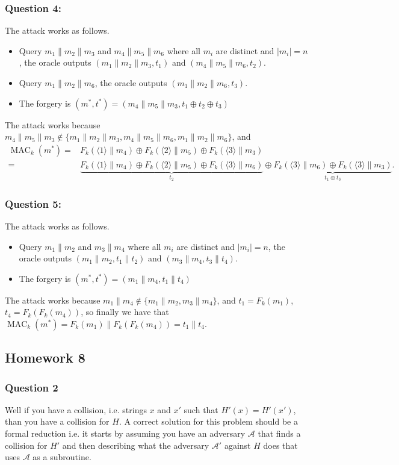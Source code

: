 \documentclass{article}
\numberwithin{defn}{section}
\numberwithin{equation}{section}
\newcommand{\MAC}{\operatorname{MAC}}
\begin{document}
\subsubsection*{Question 4:}
The attack works as follows. 
\begin{itemize}
	\item Query $m_1\|m_2\|m_3$ and $m_4\|m_5\|m_6$ where all $m_i$ are distinct and $|m_i|=n$, the oracle outputs $( m_1\|m_2\|m_3,t_1)$ and $( m_4\|m_5\|m_6,t_2)$.
	\item Query $m_1\|m_2\|m_6$, the oracle outputs $(m_1\|m_2\|m_6,t_3)$.
	\item The forgery is $(m^*,t^*)=( m_4\|m_5\|m_3,t_1\oplus t_2\oplus t_3 )$
\end{itemize}	
The attack works because $m_4\|m_5\|m_3\not\in \{m_1\|m_2\|m_3, m_4\|m_5\|m_6,m_1\|m_2\|m_6 \}$, and
\begin{align*}
\MAC_k(m^*)=&F_k(\langle 1\rangle \|m_4)\oplus F_k(\langle 2\rangle \|m_5)\oplus F_k(\langle 3\rangle \|m_3)\\
=& \underset{t_2}{\underbrace{F_k(\langle 1\rangle \|m_4)\oplus F_k(\langle 2\rangle \|m_5)\oplus F_k(\langle 3\rangle \|m_6)}} \oplus \underset{t_1\oplus t_3}{\underbrace{F_k(\langle 3\rangle \|m_6)\oplus F_k(\langle 3\rangle \|m_3)}}.
\end{align*}

\subsubsection*{Question 5:}
The attack works as follows. 
\begin{itemize}
	\item Query $m_1\|m_2$ and $m_3\|m_4$ where all $m_i$ are distinct and $|m_i|=n$, the oracle outputs $( m_1\|m_2,t_1\| t_2)$ and $( m_3\|m_4 ,t_3\|t_4)$.
	\item The forgery is $(m^*,t^*)=( m_1\|m_4,t_1\| t_4 )$
\end{itemize}	
The attack works because $m_1\|m_4 \not\in \{m_1\|m_2, m_3\|m_4 \}$, and $t_1=F_k(m_1)$, $t_4=F_k(F_k(m_4))$, so finally we have that $\MAC_k(m^*)=F_k(m_1)\|  F_k(F_k(m_4))=t_1\|t_4$. 
	

\subsection*{Homework 8}

	\subsubsection*{Question 2}
	Well if you have a collision, i.e. strings $x$ and $x'$ such that $H'(x)=H'(x')$, than you have a collision for $H$. A correct solution for this problem should be a formal reduction i.e. it starts by assuming you have an adversary $\mathcal{A}$ that finds a collision for $H'$ and then describing what the adversary $\mathcal{A}'$ against $H$ does that uses $\mathcal{A}$ as a subroutine.
	
\end{document}
